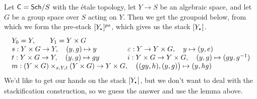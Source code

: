  Let $\text{\sf C}=\text{\sf Sch}/S$ with the \'etale topology, let $Y\to S$ be an algebraic space, and let
 $G$ be a group space over $S$ acting on $Y$. Then we get the groupoid below, from which
 we form the pre-stack $[Y_\udot]^{ps}$, which gives us the stack $[Y_\udot]$.
 \[\begin{array}{l@{\qquad\qquad}l}
   Y_0=Y,\qquad Y_1=Y\times G\\
   s: Y\times G\to Y,\quad (y,g)\mapsto y &
   \e:Y\to Y\times G,\quad y\mapsto (y,e)\\
   t: Y\times G\to Y,\quad (y,g)\mapsto gy &
   i:Y\times G\to Y\times G,\quad (y,g)\mapsto (gy,g^{-1})\\
   \multicolumn{2}{l}{m:(Y\times G)\times_{s,Y,t}(Y\times G)\to Y\times G,\quad
   \bigl((gy,h),(y,g)\bigr)\mapsto (y,hg)}
 \end{array}\]
 We'd like to get our hands on the stack $[Y_\udot]$, but we don't want to deal with the
 stackification construction, so we guess the answer and use the lemma above.


